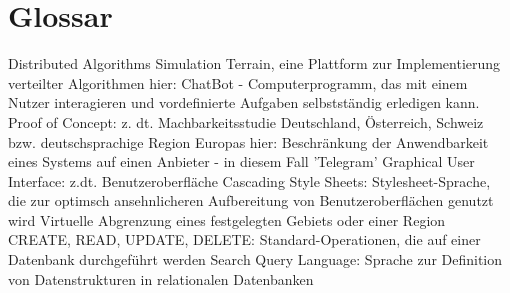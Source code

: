 \chapter{Glossar}

		        {Distributed Algorithms Simulation Terrain, eine Plattform zur Implementierung verteilter Algorithmen \cite{Gottwald:03}}
			    {hier: ChatBot - Computerprogramm, das mit einem Nutzer interagieren und vordefinierte Aufgaben selbstständig erledigen kann.}
			    {Proof of Concept: z. dt. Machbarkeitsstudie}
	            {Deutschland, Österreich, Schweiz bzw. deutschsprachige Region Europas}
	{hier: Beschränkung der Anwendbarkeit eines Systems auf einen Anbieter - in diesem Fall 'Telegram'}
			    {Graphical User Interface: z.dt. Benutzeroberfläche}
              {Cascading Style Sheets: Stylesheet-Sprache, die zur optimsch ansehnlicheren Aufbereitung von Benutzeroberflächen genutzt wird}
      {Virtuelle Abgrenzung eines festgelegten Gebiets oder einer Region}
             {CREATE, READ, UPDATE, DELETE: Standard-Operationen, die auf einer Datenbank durchgeführt werden}
              {Search Query Language:  Sprache zur Definition von Datenstrukturen in relationalen Datenbanken}

